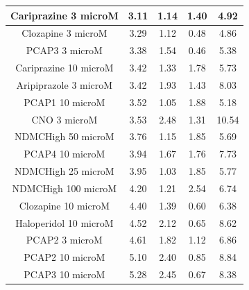 \documentclass[a4paper,12pt]{article}
\begin{document}
\begin{table}[h!]
\begin{tabular}{|c|c|c|c|c|}
Cariprazine 3 microM   & 3.11 & 1.14 & 1.40  & 4.92  \\ \hline
Clozapine 3 microM     & 3.29 & 1.12 & 0.48 & 4.86  \\ \hline
PCAP3 3 microM       & 3.38 & 1.54 & 0.46 & 5.38  \\ \hline
Cariprazine 10 microM  & 3.42 & 1.33 & 1.78 & 5.73  \\ \hline
Aripiprazole 3 microM  & 3.42 & 1.93 & 1.43 & 8.03  \\ \hline
PCAP1 10 microM        & 3.52 & 1.05 & 1.88 & 5.18  \\ \hline
CNO 3 microM           & 3.53 & 2.48 & 1.31 & 10.54 \\ \hline
NDMCHigh 50 microM     & 3.76 & 1.15 & 1.85 & 5.69  \\ \hline
PCAP4 10 microM      & 3.94 & 1.67 & 1.76 & 7.73  \\ \hline
NDMCHigh 25 microM     & 3.95 & 1.03 & 1.85 & 5.77  \\ \hline
NDMCHigh 100 microM    & 4.20  & 1.21 & 2.54 & 6.74  \\ \hline
Clozapine 10 microM    & 4.40  & 1.39 & 0.60  & 6.38  \\ \hline
Haloperidol 10 microM  & 4.52 & 2.12 & 0.65 & 8.62  \\ \hline
PCAP2 3 microM         & 4.61 & 1.82 & 1.12 & 6.86  \\ \hline
PCAP2 10 microM        & 5.10  & 2.40  & 0.85 & 8.84  \\ \hline
PCAP3 10 microM      & 5.28 & 2.45 & 0.67 & 8.38  \\\hline
\end{tabular}
\end{table}
\newpage
\end{document}
